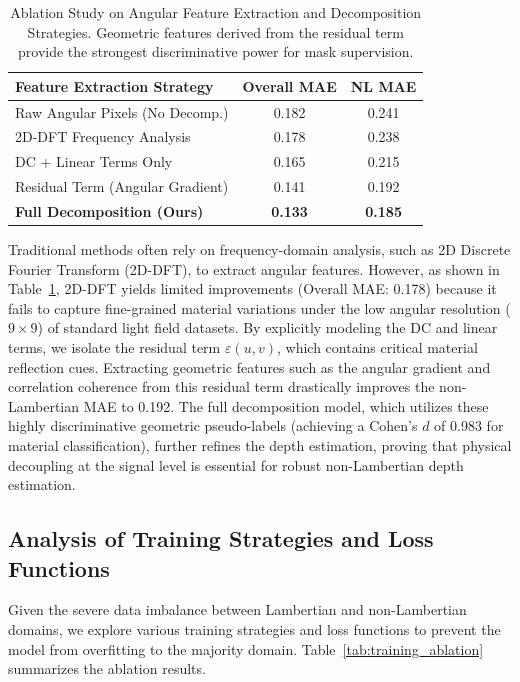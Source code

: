 \documentclass[lettersize,journal]{IEEEtran}
\begin{document}
\begin{table}[!t]
\centering
\caption{Ablation Study on Angular Feature Extraction and Decomposition Strategies. Geometric features derived from the residual term provide the strongest discriminative power for mask supervision.}
\label{tab:feature_ablation}
\begin{tabular}{lcc}
\toprule
\textbf{Feature Extraction Strategy} & \textbf{Overall MAE} & \textbf{NL MAE} \\
\midrule
Raw Angular Pixels (No Decomp.) & 0.182 & 0.241 \\
2D-DFT Frequency Analysis & 0.178 & 0.238 \\
DC + Linear Terms Only & 0.165 & 0.215 \\
Residual Term (Angular Gradient) & 0.141 & 0.192 \\
\textbf{Full Decomposition (Ours)} & \textbf{0.133} & \textbf{0.185} \\
\bottomrule
\end{tabular}
\end{table}

Traditional methods often rely on frequency-domain analysis, such as 2D Discrete Fourier Transform (2D-DFT), to extract angular features. However, as shown in Table~\ref{tab:feature_ablation}, 2D-DFT yields limited improvements (Overall MAE: 0.178) because it fails to capture fine-grained material variations under the low angular resolution ($9 \times 9$) of standard light field datasets. By explicitly modeling the DC and linear terms, we isolate the residual term $\varepsilon(u,v)$, which contains critical material reflection cues. Extracting geometric features such as the angular gradient and correlation coherence from this residual term drastically improves the non-Lambertian MAE to 0.192. The full decomposition model, which utilizes these highly discriminative geometric pseudo-labels (achieving a Cohen's $d$ of 0.983 for material classification), further refines the depth estimation, proving that physical decoupling at the signal level is essential for robust non-Lambertian depth estimation.

\subsection{Analysis of Training Strategies and Loss Functions}

Given the severe data imbalance between Lambertian and non-Lambertian domains, we explore various training strategies and loss functions to prevent the model from overfitting to the majority domain. Table~\ref{tab:training_ablation} summarizes the ablation results.
\end{document}
